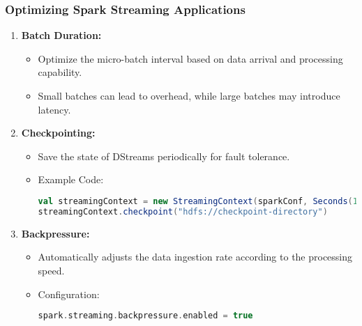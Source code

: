 \documentclass[aspectratio=169]{beamer}
\begin{document}
\begin{frame}[fragile]
    \frametitle{Optimizing Spark Streaming Applications}
    \begin{enumerate}
        \item \textbf{Batch Duration:}
            \begin{itemize}
                \item Optimize the micro-batch interval based on data arrival and processing capability.
                \item Small batches can lead to overhead, while large batches may introduce latency.
            \end{itemize}

        \item \textbf{Checkpointing:}
            \begin{itemize}
                \item Save the state of DStreams periodically for fault tolerance.
                \item Example Code:
                \begin{lstlisting}[language=scala]
val streamingContext = new StreamingContext(sparkConf, Seconds(1))
streamingContext.checkpoint("hdfs://checkpoint-directory")
                \end{lstlisting}
            \end{itemize}

        \item \textbf{Backpressure:}
            \begin{itemize}
                \item Automatically adjusts the data ingestion rate according to the processing speed.
                \item Configuration:
                \begin{lstlisting}[language=scala]
spark.streaming.backpressure.enabled = true
                \end{lstlisting}
            \end{itemize}
    \end{enumerate}
\end{frame}
\end{document}

